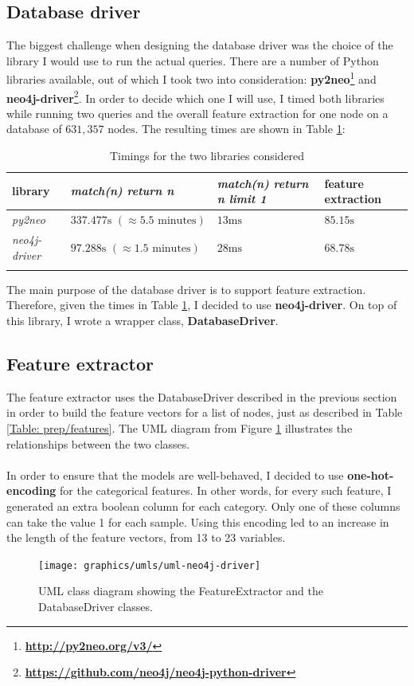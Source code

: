 	\subsection{Database driver} \label{Section: impl/neo4j/driver}
	The biggest challenge when designing the database driver was the choice of the library I would use to run the actual queries. There are a number of Python libraries available, out of which I took two into consideration: \textbf{py2neo}\footnote{\textbf{\url{http://py2neo.org/v3/}}} and \textbf{neo4j-driver}\footnote{\textbf{\url{https://github.com/neo4j/neo4j-python-driver}}}. In order to decide which one I will use, I timed both libraries while running two queries and the overall feature extraction for one node on a database of $631, 357 \text{ nodes}$. The resulting times are shown in Table \ref{Table: impl/neo4j-driver-timings}:
	\begin{longtable}{|p{}|p{}p{}p{}|}
		\textbf{library} & \textbf{\textit{match(n) return n}} & \textbf{\textit{match(n) return n limit 1}} & \textbf{feature extraction} \\
		\hline
		\textit{py2neo} & $337.477\text{s } (\approx5.5 \text{ minutes})$ & $13\text{ms}$ & $85.15\text{s}$ \\ 
		\textit{neo4j-driver} & $97.288\text{s }(\approx1.5 \text{ minutes})$ & $28\text{ms}$ & $68.78\text{s}$  \\
		\hline
		\caption[Neo4J libraries timings]{\centering Timings for the two libraries considered}
		\label{Table: impl/neo4j-driver-timings}
	\end{longtable}
	The main purpose of the database driver is to support feature extraction. Therefore, given the times in Table \ref{Table: impl/neo4j-driver-timings}, I decided to use \textbf{neo4j-driver}. On top of this library, I wrote a wrapper class, \textbf{DatabaseDriver}. 
	\subsection{Feature extractor} \label{Section: impl/neo4j/features}
	The feature extractor uses the DatabaseDriver described in the previous section in order to build the feature vectors for a list of nodes, just as described in Table \ref{Table: prep/features}. The UML diagram from Figure \ref{Fig: impl/neo4j-driver-uml} illustrates the relationships between the two classes.
	\\ \\
	In order to ensure that the models are well-behaved, I decided to use \textbf{one-hot-encoding} for the categorical features. In other words, for every such feature, I generated an extra boolean column for each category. Only one of these columns can take the value 1 for each sample. Using this encoding led to an increase in the length of the feature vectors, from 13 to 23 variables. 
	\begin{figure}[H]
		\centering
		\texttt{[image: graphics/umls/uml-neo4j-driver]}
		\caption[FeatureExtractor UML class diagram]{\centering UML class diagram showing the FeatureExtractor and the DatabaseDriver classes.}
		\label{Fig: impl/neo4j-driver-uml}
	\end{figure}
